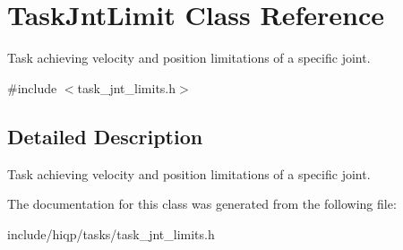 \hypertarget{classTaskJntLimit}{\section{Task\-Jnt\-Limit Class Reference}
\label{classTaskJntLimit}
}


Task achieving velocity and position limitations of a specific joint.  




{\ttfamily \#include $<$task\-\_\-jnt\-\_\-limits.\-h$>$}



\subsection{Detailed Description}
Task achieving velocity and position limitations of a specific joint. 

The documentation for this class was generated from the following file\-:\begin{DoxyCompactItemize}
\item 
include/hiqp/tasks/task\-\_\-jnt\-\_\-limits.\-h\end{DoxyCompactItemize}
